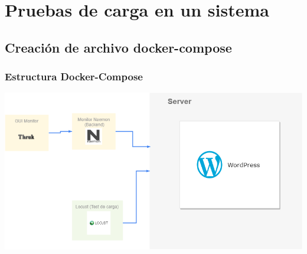 \documentclass{beamer}
\theoremstyle{plain}
\theoremstyle{definition}
\theoremstyle{plain}
\theoremstyle{definition}
\theoremstyle{remark}
\theoremstyle{definition}
\begin{document}
\section{Pruebas de carga en un sistema} 

\subsection{Creación de archivo docker-compose}
\begin{frame}
	\frametitle{Estructura Docker-Compose}
	\centering
	\includegraphics[scale=0.3]{imagenes/process.png}
\end{frame}
\end{document}
